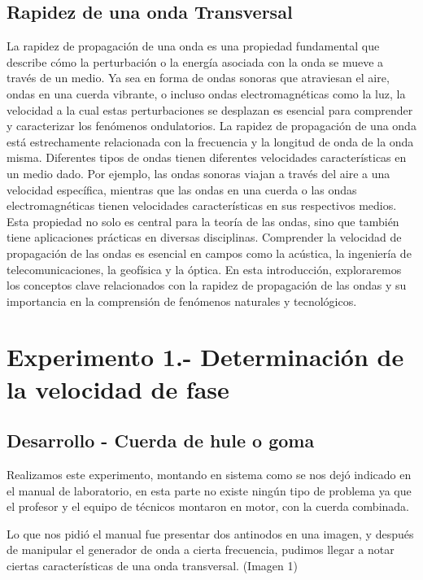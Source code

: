 \documentclass[10pt]{article}
\begin{document}
\begin{multicols}{2}
\subsection{Rapidez de una onda Transversal}
La rapidez de propagación de una onda es una propiedad fundamental que describe cómo la perturbación o la energía asociada con la onda se mueve a través de un medio. Ya sea en forma de ondas sonoras que atraviesan el aire, ondas en una cuerda vibrante, o incluso ondas electromagnéticas como la luz, la velocidad a la cual estas perturbaciones se desplazan es esencial para comprender y caracterizar los fenómenos ondulatorios.
La rapidez de propagación de una onda está estrechamente relacionada con la frecuencia y la longitud de onda de la onda misma. Diferentes tipos de ondas tienen diferentes velocidades características en un medio dado. Por ejemplo, las ondas sonoras viajan a través del aire a una velocidad específica, mientras que las ondas en una cuerda o las ondas electromagnéticas tienen velocidades características en sus respectivos medios.
Esta propiedad no solo es central para la teoría de las ondas, sino que también tiene aplicaciones prácticas en diversas disciplinas. Comprender la velocidad de propagación de las ondas es esencial en campos como la acústica, la ingeniería de telecomunicaciones, la geofísica y la óptica. En esta introducción, exploraremos los conceptos clave relacionados con la rapidez de propagación de las ondas y su importancia en la comprensión de fenómenos naturales y tecnológicos.



\section{Experimento 1.- Determinación de la velocidad de fase}
\subsection{Desarrollo - Cuerda de hule o goma}
Realizamos este experimento, montando en sistema como se nos dejó indicado en el manual de laboratorio, en esta parte no existe ningún tipo de problema ya que el profesor y el equipo de técnicos montaron en motor, con la cuerda combinada.

Lo que nos pidió el manual fue presentar dos antinodos en una imagen, y después de manipular el generador de onda a cierta frecuencia, pudimos llegar a notar ciertas características de una onda transversal. (Imagen 1) \\


\end{multicols}
\end{document}

